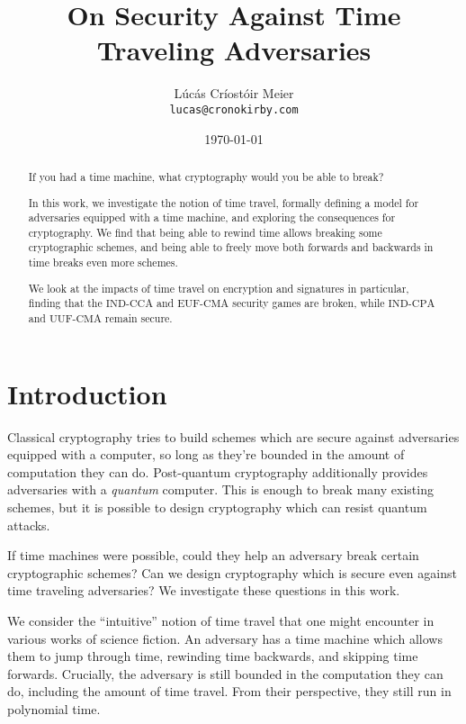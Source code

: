 

\date{\today}
\title{On Security Against Time Traveling Adversaries}
\author{Lúcás Críostóir Meier\\\texttt{lucas@cronokirby.com}}



\maketitle

\begin{abstract}
    \noindent If you had a time machine, what cryptography would you be able to break?

    In this work, we investigate the notion of time travel, formally defining a model for adversaries
    equipped with a time machine, and exploring the consequences
    for cryptography.
    We find that being able to rewind time allows breaking some
    cryptographic schemes, and being able to freely move both
    forwards and backwards in time breaks even more schemes.

    We look at the impacts of time travel on encryption and signatures in particular,
    finding that the $\text{IND-CCA}$ and $\text{EUF-CMA}$ security
    games are broken, while $\text{IND-CPA}$ and $\text{UUF-CMA}$
    remain secure.
\end{abstract}

\section{Introduction}

Classical cryptography tries to build schemes which are secure
against adversaries equipped with a computer, so long as they're
bounded in the amount of computation they can do.
Post-quantum cryptography additionally provides adversaries
with a \emph{quantum} computer.
This is enough to break many existing schemes, but it is possible to
design cryptography which can resist quantum attacks.

If time machines were possible, could they help an adversary break
certain cryptographic schemes? Can we design cryptography which
is secure even against time traveling adversaries?
We investigate these questions in this work.

We consider the ``intuitive'' notion of time travel that one might
encounter in various works of science fiction.
An adversary has a time machine which allows them to jump through
time, rewinding time backwards, and skipping time forwards.
Crucially, the adversary is still bounded in the computation
they can do, including the amount of time travel.
From their perspective, they still run in polynomial time.


